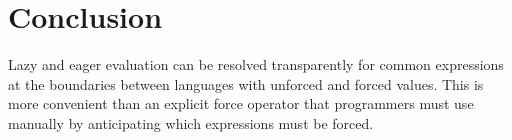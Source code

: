 \section{Conclusion}

Lazy and eager evaluation can be resolved transparently for common expressions at the boundaries between languages with unforced and forced values. This is more convenient than an explicit force operator that programmers must use manually by anticipating which expressions must be forced.